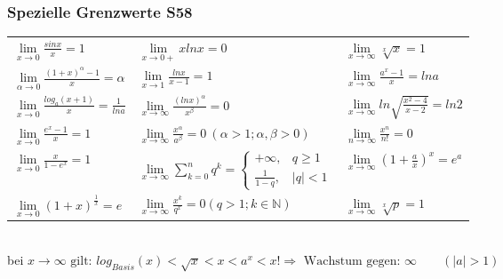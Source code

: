 		
		\subsubsection{Spezielle Grenzwerte \color{red}S58}
		
		\begin{minipage}{10cm}		
			\begin{tabulary}{10cm}{LLL}
				
				$\lim\limits_{x\to 0}\frac{sinx}{x}=1$							& $\lim\limits_{x\to 0+}x ln x=0$ 												& 	$\lim\limits_{x\to\infty}\sqrt[x]{x}=1$\\
				
				$\lim\limits_{\alpha \to0}\frac{(1+x)^{\alpha}-1}{x}=\alpha$	&  $\lim\limits_{x\to 1}\frac{lnx}{x-1}=1$													& 	$\lim\limits_{x\to\infty}\frac{a^{x}-1}{x}=lna$		\\ 
				
				$\lim\limits_{x\to 0}\frac{log_{a}(x+1)}{x}=\frac{1}{ln a}$ 	& $\lim\limits_{x\to\infty}\frac{(lnx)^{\alpha}}{x^{\beta}}=0$ 							& 	$\lim\limits_{x\to\infty}ln\sqrt{\frac{x^{2}-4}{x-2}}=ln2$	\\
				
				$\lim\limits_{x\to 0}\frac{e^{x}-1}{x}=1$ 						& $\lim\limits_{x\to\infty}\frac{x^{\alpha}}{a^{\beta}}=0 \ (\alpha>1;\alpha,\beta>0)$	&	$\lim\limits_{n\to\infty}\frac{x^{n}}{n!}=0$ \\
				
				$\lim\limits_{x\to 0}\frac{x}{1-e^{x}}=1$						& $\lim\limits_{x\to \infty} \sum\limits_{k=0}^{n} q^{k} = {\begin{cases} +\infty, 		& 	q \geq 1 \\ 
				\frac{1}{1-q},													& |q|<1 \end{cases}}  $ 																&	$\lim\limits_{x\to\infty}\left(1+\frac{a}{x}\right)^{x}=e^{a}$	\\
				
				$\lim\limits_{x\to 0}(1+x)^{\frac{1}{x}}=e$ 								& $\lim\limits_{x\to\infty}\frac{x^{k}}{q^{x}}=0 (q>1;k\in\mathbb{N})$ 					&  $\lim\limits_{x\to\infty}\sqrt[x]{p}=1$	\\
			\end{tabulary}\\[2mm]
		bei $x \to \infty \text{ gilt: } log_{Basis}(x) < \sqrt{x} < x < a^{x} < x! \Rightarrow \text{ Wachstum gegen: } \infty \qquad (|a|>1 )$	\\
		\end{minipage}
		\vrule
		\hspace{1mm}
